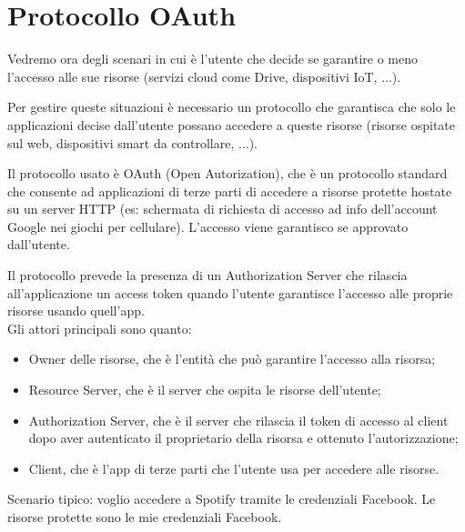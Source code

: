 \chapter{Protocollo OAuth}
Vedremo ora degli scenari in cui è l'utente che decide se garantire o meno l'accesso alle sue risorse (servizi cloud come Drive, dispositivi IoT, ...).

Per gestire queste situazioni è necessario un protocollo che garantisca che solo le applicazioni decise dall'utente possano accedere a queste risorse (risorse ospitate sul web, dispositivi smart da controllare, ...).

Il protocollo usato è OAuth (Open Autorization), che è un protocollo standard che consente ad applicazioni di terze parti di accedere a risorse protette hostate su un server HTTP (es: schermata di richiesta di accesso ad info dell'account Google nei giochi per cellulare). L'accesso viene garantisco se approvato dall'utente.

Il protocollo prevede la presenza di un Authorization Server che rilascia all'applicazione un access token quando l'utente garantisce l'accesso alle proprie risorse usando quell'app.
\\

\noindent Gli attori principali sono quanto:
\begin{itemize}
    \item Owner delle risorse, che è l'entità che può garantire l'accesso alla risorsa;
    \item Resource Server, che è il server che ospita le risorse dell'utente;
    \item Authorization Server, che è il server che rilascia il token di accesso al client dopo aver autenticato il proprietario della risorsa e ottenuto l'autorizzazione;
    \item Client, che è l'app di terze parti che l'utente usa per accedere alle risorse.
\end{itemize}

\noindent Scenario tipico: voglio accedere a Spotify tramite le credenziali Facebook. Le risorse protette sono le mie credenziali Facebook.
\\

